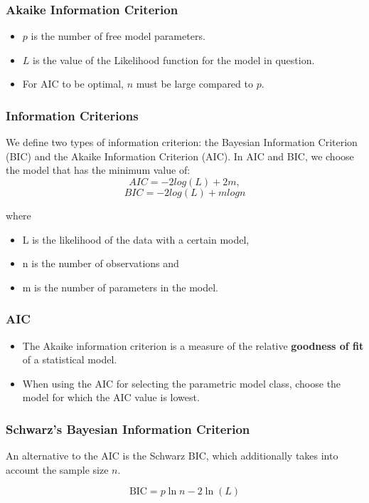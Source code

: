 \documentclass[PredictiveAnalytics101.tex]{subfiles}
\begin{document}
	\begin{frame}
		\frametitle{Akaike Information Criterion}
		\Large
		\begin{itemize}
			\item $p$ is the number of free model parameters.
			\item $L$ is the value of the Likelihood function for the model in question.
			\item For AIC to be optimal, $n$ must be large compared to $p$.\\
		\end{itemize}
	\end{frame}
\begin{frame}
\frametitle{Information Criterions}


We define two types of information criterion: the Bayesian Information
Criterion (BIC) and the Akaike Information Criterion (AIC). In AIC and BIC, we choose the model that
has the minimum value of:
\[AIC = −2log(L)+2m,\]
\[BIC = −2log(L)+mlogn\]

where
\begin{itemize}
\item L is the likelihood of the data with a certain model,
\item n is the number of observations and
\item m is the number of parameters in the model.
\end{itemize}
\end{frame}
\begin{frame}
\frametitle{AIC}
\Large
\begin{itemize}
\item The Akaike information criterion is a measure of the relative \textbf{goodness of fit} of a statistical model.

\item When using the AIC for selecting the parametric model class, choose
the model for which the AIC value is lowest.
\end{itemize}
\end{frame}
\begin{frame}
\frametitle{Schwarz's Bayesian Information Criterion}
An alternative to the AIC is the Schwarz BIC, which additionally takes into account the sample size $n$.

\[\mbox{BIC} = p\ln{n} - 2\ln(L)\]
\end{frame}
\end{document}
